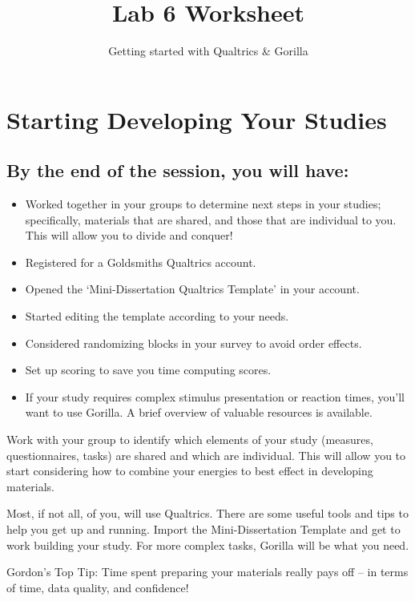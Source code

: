 \documentclass[
  letterpaper,
  DIV=11,
  numbers=noendperiod]{scrartcl}
\title{\textbf{Lab 6 Worksheet}}
\subtitle{Getting started with Qualtrics \& Gorilla}
\author{}
\date{}
\providecommand{\tightlist}{%
  \setlength{\itemsep}{0pt}\setlength{\parskip}{0pt}}\usepackage{longtable,booktabs,array}
\begin{document}
\maketitle

\raggedright

\section{Starting Developing Your
Studies}\label{starting-developing-your-studies}

\subsection{By the end of the session, you will
have:}\label{by-the-end-of-the-session-you-will-have}

\begin{itemize}
\tightlist
\item
  Worked together in your groups to determine next steps in your
  studies; specifically, materials that are shared, and those that are
  individual to you. This will allow you to divide and conquer!
\item
  Registered for a Goldsmiths Qualtrics account.
\item
  Opened the `Mini-Dissertation Qualtrics Template' in your account.
\item
  Started editing the template according to your needs.
\item
  Considered randomizing blocks in your survey to avoid order effects.
\item
  Set up scoring to save you time computing scores.
\item
  If your study requires complex stimulus presentation or reaction
  times, you'll want to use Gorilla. A brief overview of valuable
  resources is available.
\end{itemize}

Work with your group to identify which elements of your study (measures,
questionnaires, tasks) are shared and which are individual. This will
allow you to start considering how to combine your energies to best
effect in developing materials.

Most, if not all, of you, will use Qualtrics. There are some useful
tools and tips to help you get up and running. Import the
Mini-Dissertation Template and get to work building your study. For more
complex tasks, Gorilla will be what you need.

Gordon's Top Tip: Time spent preparing your materials really pays off --
in terms of time, data quality, and confidence!
\end{document}
